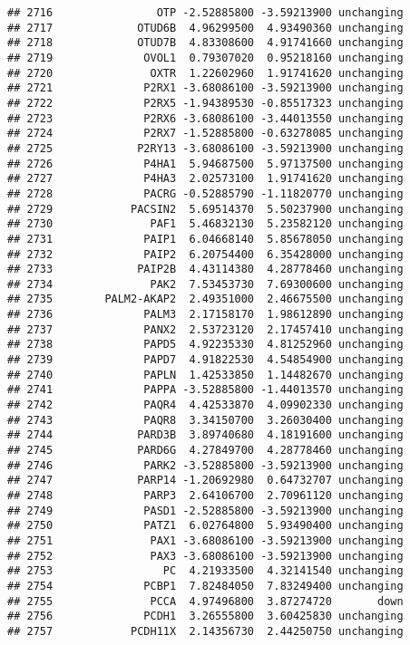\documentclass[]{article}
\begin{document}
\begin{verbatim}
## 2716                OTP -2.52885800 -3.59213900 unchanging
## 2717             OTUD6B  4.96299500  4.93490360 unchanging
## 2718             OTUD7B  4.83308600  4.91741660 unchanging
## 2719              OVOL1  0.79307020  0.95218160 unchanging
## 2720               OXTR  1.22602960  1.91741620 unchanging
## 2721              P2RX1 -3.68086100 -3.59213900 unchanging
## 2722              P2RX5 -1.94389530 -0.85517323 unchanging
## 2723              P2RX6 -3.68086100 -3.44013550 unchanging
## 2724              P2RX7 -1.52885800 -0.63278085 unchanging
## 2725             P2RY13 -3.68086100 -3.59213900 unchanging
## 2726              P4HA1  5.94687500  5.97137500 unchanging
## 2727              P4HA3  2.02573100  1.91741620 unchanging
## 2728              PACRG -0.52885790 -1.11820770 unchanging
## 2729            PACSIN2  5.69514370  5.50237900 unchanging
## 2730               PAF1  5.46832130  5.23582120 unchanging
## 2731              PAIP1  6.04668140  5.85678050 unchanging
## 2732              PAIP2  6.20754400  6.35428000 unchanging
## 2733             PAIP2B  4.43114380  4.28778460 unchanging
## 2734               PAK2  7.53453730  7.69300600 unchanging
## 2735        PALM2-AKAP2  2.49351000  2.46675500 unchanging
## 2736              PALM3  2.17158170  1.98612890 unchanging
## 2737              PANX2  2.53723120  2.17457410 unchanging
## 2738              PAPD5  4.92235330  4.81252960 unchanging
## 2739              PAPD7  4.91822530  4.54854900 unchanging
## 2740              PAPLN  1.42533850  1.14482670 unchanging
## 2741              PAPPA -3.52885800 -1.44013570 unchanging
## 2742              PAQR4  4.42533870  4.09902330 unchanging
## 2743              PAQR8  3.34150700  3.26030400 unchanging
## 2744             PARD3B  3.89740680  4.18191600 unchanging
## 2745             PARD6G  4.27849700  4.28778460 unchanging
## 2746              PARK2 -3.52885800 -3.59213900 unchanging
## 2747             PARP14 -1.20692980  0.64732707 unchanging
## 2748              PARP3  2.64106700  2.70961120 unchanging
## 2749              PASD1 -2.52885800 -3.59213900 unchanging
## 2750              PATZ1  6.02764800  5.93490400 unchanging
## 2751               PAX1 -3.68086100 -3.59213900 unchanging
## 2752               PAX3 -3.68086100 -3.59213900 unchanging
## 2753                 PC  4.21933500  4.32141540 unchanging
## 2754              PCBP1  7.82484050  7.83249400 unchanging
## 2755               PCCA  4.97496800  3.87274720       down
## 2756              PCDH1  3.26555800  3.60425830 unchanging
## 2757            PCDH11X  2.14356730  2.44250750 unchanging

\end{verbatim}
\end{document}
